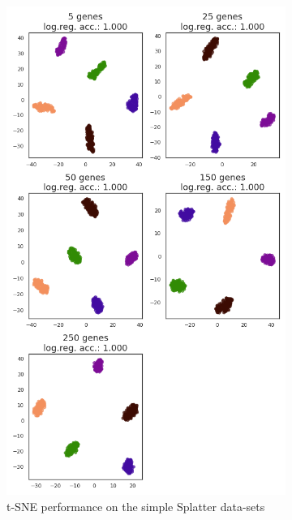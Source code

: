 \begin{figure}[h]
\centering
\begin{subfigure}{.3\textwidth}
  \centering
  \includegraphics[width=\linewidth]{figs/TSNE_simple.png}
  \caption{\small t-SNE performance on the simple Splatter data-sets}
  \label{fig:tmse_simple}
\end{subfigure}\hspace{30px}%
\begin{subfigure}{.3\textwidth}
  \centering

\end{subfigure}
\end{figure}
